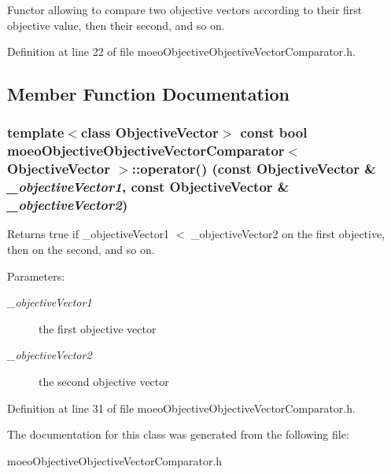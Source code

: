 Functor allowing to compare two objective vectors according to their first objective value, then their second, and so on. 



Definition at line 22 of file moeo\-Objective\-Objective\-Vector\-Comparator.h.

\subsection{Member Function Documentation}
\subsubsection{\setlength{\rightskip}{0pt plus 5cm}template$<$class Objective\-Vector$>$ const bool \bf{moeo\-Objective\-Objective\-Vector\-Comparator}$<$ Objective\-Vector $>$::operator() (const Objective\-Vector \& {\em \_\-objective\-Vector1}, const Objective\-Vector \& {\em \_\-objective\-Vector2})\hspace{0.3cm}{\tt  [inline]}}\label{classmoeoObjectiveObjectiveVectorComparator_bc3c97b380e87107e92f52843a7f9303}


Returns true if \_\-objective\-Vector1 $<$ \_\-objective\-Vector2 on the first objective, then on the second, and so on. 

\begin{Desc}
\item[Parameters:]
\begin{description}
\item[{\em \_\-objective\-Vector1}]the first objective vector \item[{\em \_\-objective\-Vector2}]the second objective vector \end{description}
\end{Desc}


Definition at line 31 of file moeo\-Objective\-Objective\-Vector\-Comparator.h.

The documentation for this class was generated from the following file:\begin{CompactItemize}
\item 
moeo\-Objective\-Objective\-Vector\-Comparator.h\end{CompactItemize}
